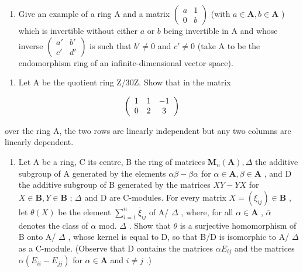 \begin{enumerate}
\def\labelenumi{(\alph{enumi})}
\setcounter{enumi}{1}
\tightlist
\item
  Give an example of a ring A and a matrix \(\begin{pmatrix} a & 1 \\ 0 & b \end{pmatrix}\) (with \(a \in \mathbf{A}, b \in \mathbf{A}\) ) which is invertible without either \(a\) or \(b\) being invertible in A and whose inverse \(\begin{pmatrix} a' & b' \\ c' & d' \end{pmatrix}\) is such that \(b' \neq 0\) and \(c' \neq 0\) (take A to be the endomorphism ring of an infinite-dimensional vector space).
\end{enumerate}

\begin{enumerate}
\def\labelenumi{\arabic{enumi}.}
\setcounter{enumi}{2}
\tightlist
\item
  Let A be the quotient ring Z/30Z. Show that in the matrix
\end{enumerate}

\[
\left( \begin{array}{c c c} 1 & 1 & - 1 \\ 0 & 2 & 3 \end{array} \right)
\]

over the ring A, the two rows are linearly independent but any two columns are linearly dependent.

\begin{enumerate}
\def\labelenumi{\arabic{enumi}.}
\setcounter{enumi}{3}
\tightlist
\item
  Let A be a ring, C its centre, B the ring of matrices \(\mathbf{M}_n(\mathbf{A}), \Delta\) the additive subgroup of A generated by the elements \(\alpha\beta - \beta\alpha\) for \(\alpha \in \mathbf{A}, \beta \in \mathbf{A}\) , and D the additive subgroup of B generated by the matrices \(XY - YX\) for \(X \in \mathbf{B}, Y \in \mathbf{B}\) ; \(\Delta\) and D are C-modules. For every matrix \(X = (\xi_{ij}) \in \mathbf{B}\) , let \(\theta(X)\) be the element \(\sum_{i=1}^{n} \bar{\xi}_{ij}\) of A/ \(\Delta\) , where, for all \(\alpha \in \mathbf{A}\) , \(\bar{\alpha}\) denotes the class of \(\alpha\) mod. \(\Delta\) . Show that \(\theta\) is a surjective homomorphism of B onto A/ \(\Delta\) , whose kernel is equal to D, so that B/D is isomorphic to A/ \(\Delta\) as a C-module. (Observe that D contains the matrices \(\alpha E_{ij}\) and the matrices \(\alpha(E_{ii} - E_{jj})\) for \(\alpha \in \mathbf{A}\) and \(i \neq j\) .)
\end{enumerate}

